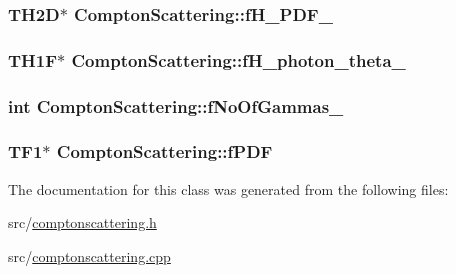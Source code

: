 \subsubsection[{\texorpdfstring{f\+H\+\_\+\+P\+D\+F\+\_\+}{fH_PDF_}}]{\setlength{\rightskip}{0pt plus 5cm}T\+H2D$\ast$ Compton\+Scattering\+::f\+H\+\_\+\+P\+D\+F\+\_\+\hspace{0.3cm}{\ttfamily [private]}}\hypertarget{classComptonScattering_aecd1718d8d180ff66e3a89f297f4458d}{}\label{classComptonScattering_aecd1718d8d180ff66e3a89f297f4458d}
\subsubsection[{\texorpdfstring{f\+H\+\_\+photon\+\_\+theta\+\_\+}{fH_photon_theta_}}]{\setlength{\rightskip}{0pt plus 5cm}T\+H1F$\ast$ Compton\+Scattering\+::f\+H\+\_\+photon\+\_\+theta\+\_\+\hspace{0.3cm}{\ttfamily [private]}}\hypertarget{classComptonScattering_ac2f4da687eadc32b94a80fe82f8e5a2b}{}\label{classComptonScattering_ac2f4da687eadc32b94a80fe82f8e5a2b}
\subsubsection[{\texorpdfstring{f\+No\+Of\+Gammas\+\_\+}{fNoOfGammas_}}]{\setlength{\rightskip}{0pt plus 5cm}int Compton\+Scattering\+::f\+No\+Of\+Gammas\+\_\+\hspace{0.3cm}{\ttfamily [private]}}\hypertarget{classComptonScattering_a7a0703c812fb29b0c80c251ae70ce0e9}{}\label{classComptonScattering_a7a0703c812fb29b0c80c251ae70ce0e9}
\subsubsection[{\texorpdfstring{f\+P\+DF}{fPDF}}]{\setlength{\rightskip}{0pt plus 5cm}T\+F1$\ast$ Compton\+Scattering\+::f\+P\+DF}\hypertarget{classComptonScattering_add23479fa60d3dab59f9baa2d2dcf76f}{}\label{classComptonScattering_add23479fa60d3dab59f9baa2d2dcf76f}


The documentation for this class was generated from the following files\+:\begin{DoxyCompactItemize}
\item 
src/\hyperlink{comptonscattering_8h}{comptonscattering.\+h}\item 
src/\hyperlink{comptonscattering_8cpp}{comptonscattering.\+cpp}\end{DoxyCompactItemize}
